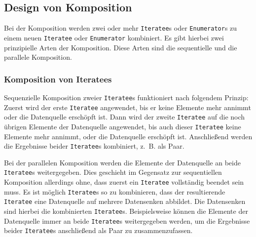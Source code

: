 

\subsection{Design von Komposition} %
\label{sub:komposition}

Bei der Komposition werden zwei oder mehr \lstinline|Iteratee|s oder \lstinline|Enumerator|s zu einem neuen \lstinline|Iteratee| oder \lstinline|Enumerator| kombiniert.
Es gibt hierbei zwei prinzipielle Arten der Komposition.
Diese Arten sind die sequentielle und die parallele Komposition.

\subsubsection{Komposition von Iteratees} %
\label{ssub:komposition_von_iteratees}

Sequenzielle Komposition zweier \lstinline|Iteratee|s funktioniert nach folgendem Prinzip:
Zuerst wird der erste \lstinline|Iteratee| angewendet, bis er keine Elemente mehr annimmt oder die Datenquelle erschöpft ist.
Dann wird der zweite \lstinline|Iteratee| auf die noch übrigen Elemente der Datenquelle angewendet, bis auch dieser \lstinline|Iteratee| keine Elemente mehr annimmt, oder die Datenquelle erschöpft ist.
Anschließend werden die Ergebnisse beider \lstinline|Iteratee|s kombiniert, z.~B. als Paar. %

Bei der parallelen Komposition werden die Elemente der Datenquelle an beide \lstinline|Iteratee|s weitergegeben.
Dies geschieht im Gegensatz zur sequentiellen Komposition allerdings ohne, dass zuerst ein \lstinline|Iteratee| vollständig beendet sein muss.
Es ist möglich \lstinline|Iteratee|s so zu kombinieren, dass der resultierende \lstinline|Iteratee| eine Datenquelle auf mehrere Datensenken abbildet.
Die Datensenken sind hierbei die kombinierten \lstinline|Iteratee|s.
Beispielsweise können die Elemente der Datenquelle immer an beide \lstinline|Iteratee|s weitergegeben werden, um die Ergebnisse beider \lstinline|Iteratee|s anschließend als Paar zu zusammenzufassen. %

